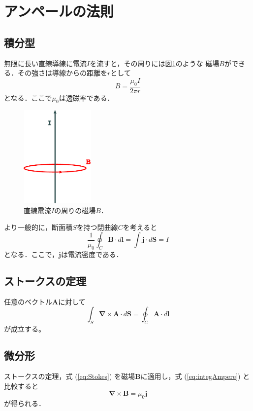 \documentclass[11pt]{jarticle}
\begin{document}
\section{アンペールの法則}
\subsection{積分型}
無限に長い直線導線に電流$I$を流すと，その周りには図\ref{fig:Ampere}のような
磁場$B$ができる．その強さは導線からの距離を$r$として
\begin{equation*} %
  B=\frac{\mu_0 I}{2\pi r} 
\end{equation*}
となる．ここで$\mu_0$は透磁率である．
\begin{figure}[h] %
  \centering
  \includegraphics[height=5cm]{Ampere1.pdf} %
  \caption{直線電流$I$の周りの磁場$B$．} %
  \label{fig:Ampere}
\end{figure} %
より一般的に，断面積$S$を持つ閉曲線$C$を考えると
\begin{equation}
  \frac{1}{\mu_0}\oint_C \bm{B}\cdot d\bm{l} = \int \bm{j} \cdot d\bm{S}=I
  \label{eq:integAmpere}
\end{equation}
となる．ここで，$\bm{j}$は電流密度である．

\subsection{ストークスの定理}
任意のベクトル$\bm{A}$に対して
\begin{equation}
  \int_S \bm{\nabla \times A}\cdot d\bm{S} = \oint_C \bm{A}\cdot d\bm{l}
  \label{eq:Stokes}
\end{equation}
が成立する。

\subsection{微分形}
ストークスの定理，式 (\ref{eq:Stokes}) を磁場$\bm{B}$に適用し，式 (\ref{eq:integAmpere})
と比較すると
\begin{equation}
  \bm{\nabla \times B} = \mu_0 \bm{j}
\end{equation}
が得られる．
\end{document}

